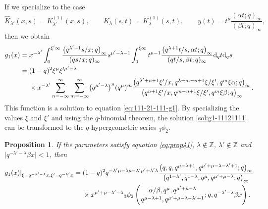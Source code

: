 \documentclass[pdftex]{sigma}
\numberwithin{equation}{section}
\newtheorem{Proposition}[Theorem]{Proposition}
\theoremstyle{definition}
\begin{document}
If we specialize to the case
\begin{equation}
\label{eq:KlpKly}
\widehat{K}_{\lambda'}(x,s) = K^{(1)}_{\lambda '}(x, s) ,\qquad K_{\lambda}(s, t) = K^{(1)}_{\lambda}(s, t) ,\qquad y(t)=t^{\mu}\frac{(\alpha t;q)_{\infty}}{(\beta t;q)_{\infty}} ,
\end{equation}
then we obtain
\begin{align}
g_1(x)
={}& x^{-\lambda'} \int_0^{\xi' \infty} \frac{\bigl(q^{\lambda '+1}s/x;q\bigr)_{\infty}}{(qs/x;q)_{\infty}} s^{\mu' - \lambda -1} \int_0^{\xi \infty} t^{\mu -1} \frac{\bigl(q^{\lambda+1}t/s, \alpha t ;q\bigr)_{\infty}}{(qt/s , \beta t ;q)_{\infty}} {\rm d}_q t {\rm d}_q s \nonumber \\
={}& (1 - q)^2 \xi^{\mu} \xi'^{\mu' - \lambda} \nonumber \\
& \times x^{-\lambda'} \sum_{n = -\infty}^{\infty} \sum_{m = -\infty}^{\infty} \bigl(q^{\mu' - \lambda}\bigr)^n (q^{\mu})^m \frac{\bigl(q^{\lambda' + n + 1}\xi'/x, q^{\lambda + m - n + 1}\xi/\xi', q^m \xi \alpha; q\bigr)_{\infty}}{\bigl(q^{n + 1}\xi'/x, q^{m - n + 1}\xi/\xi', q^m\xi \beta; q\bigr)_{\infty}}.  \label{sol:g1-11121111}
\end{align}
This function is a solution to equation \eqref{eq:111-21-111-g1}.
By specializing the values $\xi$ and $\xi'$ and using the $q$-binomial theorem, the solution \eqref{sol:g1-11121111} can be transformed to the $q$-hypergeometric series ${}_3\phi_2$.
\begin{Proposition}
If the parameters satisfy equation \eqref{eq:prop41}, $\lambda \not \in {\mathbb Z}$, $\lambda ' \not \in {\mathbb Z}$ and $\big|q^{ -\lambda ' -\lambda } \beta x\big| <1 $, then
\begin{align*}%
g_1(x) | _{\xi = q^{ -\lambda ' -\lambda } x , \xi' = q ^{-\lambda ' }x }
={}& (1 - q)^2 q^{ -\lambda ' \mu -\lambda \mu -\lambda ' \mu' + \lambda ' \lambda} \frac{\bigl(q, q, q^{\mu -\lambda + 1} , q^{\mu' +\mu - \lambda -\lambda' + 1 } ; q\bigr)_{\infty}}{\bigl(q^{1-\lambda' } , q^{1- \lambda } , q^{\mu } , q^{\mu' +\mu - \lambda } ; q\bigr)_{\infty}} \\
&\times x^{\mu' + \mu -\lambda' -\lambda } {}_3\phi_2 \left( { \alpha /\beta , q^{\mu }, q^{\mu' +\mu - \lambda } \atop{q^{\mu -\lambda + 1} , q^{\mu' +\mu - \lambda -\lambda' + 1 }}} ; q, q^{ -\lambda ' -\lambda } \beta x \right).
\end{align*}
\end{Proposition}
\end{document}
